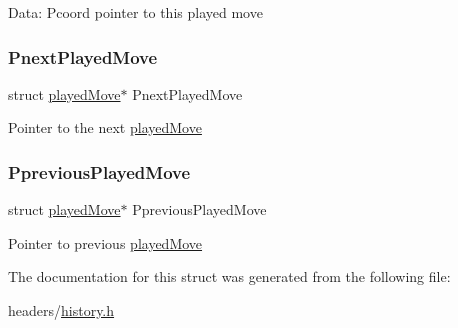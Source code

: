 Data\+: Pcoord pointer to this played move \mbox{\label{structplayed_move_a3d7384aebd5f0ff66a5ab19773ea1136}} 
\subsubsection{\texorpdfstring{Pnext\+Played\+Move}{PnextPlayedMove}}
{\footnotesize\ttfamily struct \hyperlink{structplayed_move}{played\+Move}$\ast$ Pnext\+Played\+Move}

Pointer to the next \hyperlink{structplayed_move}{played\+Move} \mbox{\label{structplayed_move_ae1f0ee9fe8e8a08023879b9656a55f62}} 
\subsubsection{\texorpdfstring{Pprevious\+Played\+Move}{PpreviousPlayedMove}}
{\footnotesize\ttfamily struct \hyperlink{structplayed_move}{played\+Move}$\ast$ Pprevious\+Played\+Move}

Pointer to previous \hyperlink{structplayed_move}{played\+Move} 

The documentation for this struct was generated from the following file\+:\begin{DoxyCompactItemize}
\item 
headers/\hyperlink{history_8h}{history.\+h}\end{DoxyCompactItemize}
